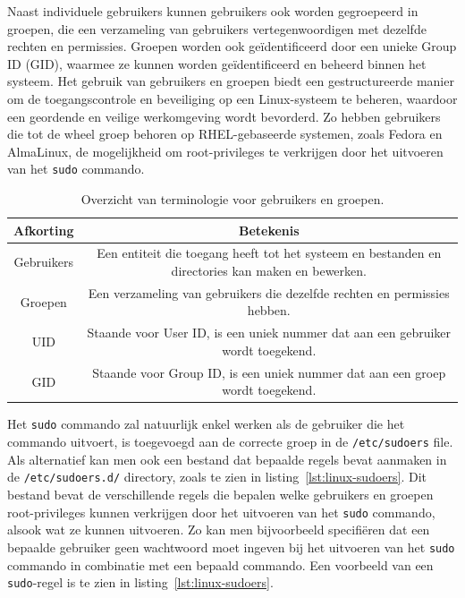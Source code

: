 Naast individuele gebruikers kunnen gebruikers ook worden gegroepeerd in groepen, die een verzameling van gebruikers vertegenwoordigen met dezelfde rechten en permissies.
Groepen worden ook ge\"identificeerd door een unieke Group ID (GID), waarmee ze kunnen worden ge\"identificeerd en beheerd binnen het systeem.
Het gebruik van gebruikers en groepen biedt een gestructureerde manier om de toegangscontrole en beveiliging op een Linux-systeem te beheren, waardoor een geordende en veilige werkomgeving wordt bevorderd.
Zo hebben gebruikers die tot de wheel groep behoren op RHEL-gebaseerde systemen, zoals Fedora en AlmaLinux, de mogelijkheid om root-privileges te verkrijgen door het uitvoeren van het \texttt{sudo} commando.

\begin{table}[!h]
    \begin{adjustbox}{width=1\textwidth}
        \begin{tabular}{ c c  }
            \hline
                Afkorting & Betekenis\\ [0.5ex] 
            \hline
                Gebruikers & Een entiteit die toegang heeft tot het systeem en bestanden en directories kan maken en bewerken. \\
                Groepen    & Een verzameling van gebruikers die dezelfde rechten en permissies hebben. \\
                UID        & Staande voor User ID, is een uniek nummer dat aan een gebruiker wordt toegekend. \\
                GID        & Staande voor Group ID, is een uniek nummer dat aan een groep wordt toegekend. \\
        \end{tabular}
    \end{adjustbox}
    \caption{Overzicht van terminologie voor gebruikers en groepen.}
    \label{table:user-group-terminology}
\end{table}

Het \texttt{sudo} commando zal natuurlijk enkel werken als de gebruiker die het commando uitvoert, is toegevoegd aan de correcte groep in de \texttt{/etc/sudoers} file.
Als alternatief kan men ook een bestand dat bepaalde regels bevat aanmaken in de \texttt{/etc/sudoers.d/} directory, zoals te zien in listing~\ref{lst:linux-sudoers}.
Dit bestand bevat de verschillende regels die bepalen welke gebruikers en groepen root-privileges kunnen verkrijgen door het uitvoeren van het \texttt{sudo} commando, alsook wat ze kunnen uitvoeren.
Zo kan men bijvoorbeeld specifi\"eren dat een bepaalde gebruiker geen wachtwoord moet ingeven bij het uitvoeren van het \texttt{sudo} commando in combinatie met een bepaald commando.
Een voorbeeld van een \texttt{sudo}-regel is te zien in listing~\ref{lst:linux-sudoers}.


